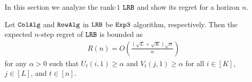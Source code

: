 


In this section we analyze the rank-$1$ ${\tt LRB}$ and show its regret for a horizon $n$.
\begin{theorem} 
\label{thm:upper bound} Let ${\tt ColAlg}$ and ${\tt RowAlg}$ in ${\tt LRB}$ be ${\tt Exp3}$ algorithm, respectively. Then the expected $n$-step regret of ${\tt LRB}$ is bounded as
\begin{align*}
  R(n) = O\left(\frac{\left(\sqrt{L } + \sqrt{K }\right)\sqrt{n}}{\alpha}\right)
\end{align*}
for any $\alpha > 0$ such that $U_{t}(i,1) \geq \alpha$ and $V_{t}(j,1) \geq \alpha$  for all $i \in [K]$, $j \in [L]$, and $t \in [n]$.


\end{theorem}
